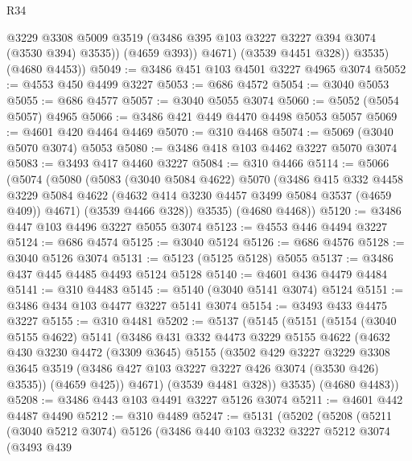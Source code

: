 \begin{lexlean}{R34}
\begin{coremodule}
                @3229
                @3308
                @5009
                @3519
                (@3486 @395 @103 @3227 @3227 @394 @3074 (@3530 @394) @3535))
              (@4659 @393))
            @4671)
          (@3539 @4451 @328))
        @3535)
      (@4680 @4453))
@5049 := @3486 @451 @103 @4501 @3227 @4965 @3074
@5052 := @4553 @450 @4499 @3227
@5053 := @686 @4572
@5054 := @3040 @5053
@5055 := @686 @4577
@5057 := @3040 @5055 @3074
@5060 := @5052 (@5054 @5057) @4965
@5066 := @3486 @421 @449 @4470 @4498 @5053 @5057
@5069 := @4601 @420 @4464 @4469
@5070 := @310 @4468
@5074 := @5069 (@3040 @5070 @3074) @5053
@5080 := @3486 @418 @103 @4462 @3227 @5070 @3074
@5083 := @3493 @417 @4460 @3227
@5084 := @310 @4466
@5114 := @5066
    (@5074
      (@5080
        (@5083
          (@3040 @5084 @4622)
          @5070
          (@3486
            @415
            @332
            @4458
            @3229
            @5084
            @4622
            (@4632 @414 @3230 @4457 @3499 @5084 @3537 (@4659 @409))
            @4671)
          (@3539 @4466 @328))
        @3535)
      (@4680 @4468))
@5120 := @3486 @447 @103 @4496 @3227 @5055 @3074
@5123 := @4553 @446 @4494 @3227
@5124 := @686 @4574
@5125 := @3040 @5124
@5126 := @686 @4576
@5128 := @3040 @5126 @3074
@5131 := @5123 (@5125 @5128) @5055
@5137 := @3486 @437 @445 @4485 @4493 @5124 @5128
@5140 := @4601 @436 @4479 @4484
@5141 := @310 @4483
@5145 := @5140 (@3040 @5141 @3074) @5124
@5151 := @3486 @434 @103 @4477 @3227 @5141 @3074
@5154 := @3493 @433 @4475 @3227
@5155 := @310 @4481
@5202 := @5137
    (@5145
      (@5151
        (@5154
          (@3040 @5155 @4622)
          @5141
          (@3486
            @431
            @332
            @4473
            @3229
            @5155
            @4622
            (@4632
              @430
              @3230
              @4472
              (@3309 @3645)
              @5155
              (@3502
                @429
                @3227
                @3229
                @3308
                @3645
                @3519
                (@3486 @427 @103 @3227 @3227 @426 @3074 (@3530 @426) @3535))
              (@4659 @425))
            @4671)
          (@3539 @4481 @328))
        @3535)
      (@4680 @4483))
@5208 := @3486 @443 @103 @4491 @3227 @5126 @3074
@5211 := @4601 @442 @4487 @4490
@5212 := @310 @4489
@5247 := @5131
    (@5202
      (@5208
        (@5211
          (@3040 @5212 @3074)
          @5126
          (@3486
            @440
            @103
            @3232
            @3227
            @5212
            @3074
            (@3493
              @439

\end{coremodule}
\end{lexlean}

